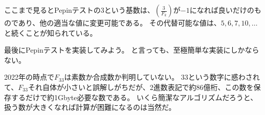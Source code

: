 ここまで見るとPepinテストの3という基数は、$\left(\frac{3}{F_k}\right)$が$-1$になれば良いだけのものであり、他の適当な値に変更可能である。
その代替可能な値は、$5,6,7,10,\ldots$と続くことが知られている。

最後にPepinテストを実装してみよう。
と言っても、至極簡単な実装にしかならない。


2022年の時点で$F_{33}$は素数か合成数か判明していない。
33という数字に惑わされて、$F_{33}$それ自体が小さいと誤解しがちだが、2進数表記で約86億桁、この数を保存するだけで約1Gbyte必要な数である。
いくら簡潔なアルゴリズムだろうと、扱う数が大きくなれば計算が困難になるのは当然だ。
